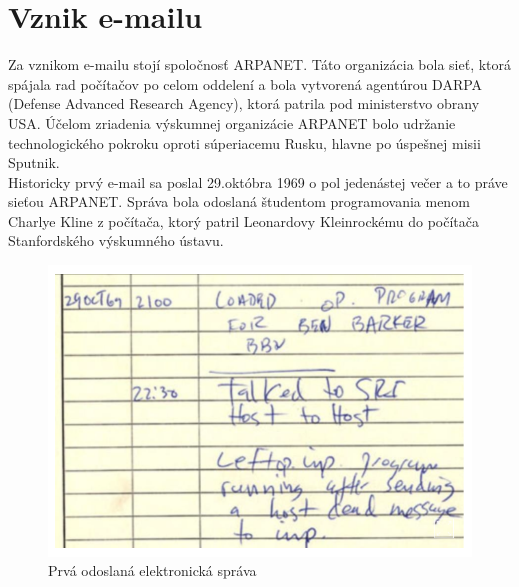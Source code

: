 \documentclass[10pt,twoside,slovak,a4paper]{article}
\begin{document}
\section{Vznik e-mailu} 

Za vznikom e-mailu stojí spoločnosť ARPANET. Táto organizácia bola sieť, ktorá spájala rad počítačov po celom oddelení a bola vytvorená agentúrou DARPA (Defense Advanced Research Agency), ktorá patrila pod ministerstvo obrany USA. Účelom zriadenia výskumnej organizácie ARPANET bolo udržanie technologického pokroku oproti súperiacemu Rusku, hlavne po úspešnej misii Sputnik.\\
\hspace{0.5cm}
Historicky prvý e-mail sa poslal 29.októbra 1969 o pol jedenástej večer a to práve sieťou ARPANET. Správa bola odoslaná študentom programovania menom Charlye Kline z počítača, ktorý patril Leonardovy Kleinrockému do počítača Stanfordského výskumného ústavu. 

\begin{figure}[tbh]
\centering
\includegraphics[scale=0.20]{firstmessage.png}
\caption{Prvá odoslaná elektronická správa \cite{UPI}}
\end{figure}
\end{document}
